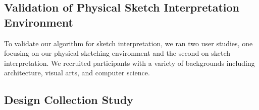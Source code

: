\subsection{Validation of Physical Sketch Interpretation Environment}

\label{section:user_study}

To validate our algorithm for sketch interpretation, we ran two user
studies, one focusing on our physical sketching environment and the
second on sketch interpretation.  We recruited participants with a
variety of backgrounds including architecture, visual arts, and
computer science.

\subsection{Design Collection Study}

